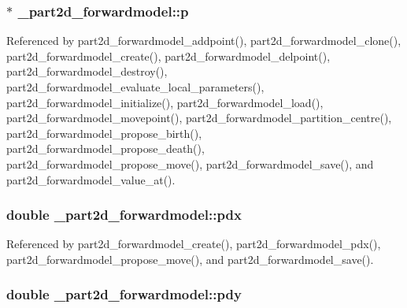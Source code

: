 \subsubsection[{\texorpdfstring{p}{p}}]{$\ast$ \+\_\+part2d\+\_\+forwardmodel\+::p}\hypertarget{struct__part2d__forwardmodel_a5e3868335795497eb056d912a0a07c12}{}\label{struct__part2d__forwardmodel_a5e3868335795497eb056d912a0a07c12}


Referenced by part2d\+\_\+forwardmodel\+\_\+addpoint(), part2d\+\_\+forwardmodel\+\_\+clone(), part2d\+\_\+forwardmodel\+\_\+create(), part2d\+\_\+forwardmodel\+\_\+delpoint(), part2d\+\_\+forwardmodel\+\_\+destroy(), part2d\+\_\+forwardmodel\+\_\+evaluate\+\_\+local\+\_\+parameters(), part2d\+\_\+forwardmodel\+\_\+initialize(), part2d\+\_\+forwardmodel\+\_\+load(), part2d\+\_\+forwardmodel\+\_\+movepoint(), part2d\+\_\+forwardmodel\+\_\+partition\+\_\+centre(), part2d\+\_\+forwardmodel\+\_\+propose\+\_\+birth(), part2d\+\_\+forwardmodel\+\_\+propose\+\_\+death(), part2d\+\_\+forwardmodel\+\_\+propose\+\_\+move(), part2d\+\_\+forwardmodel\+\_\+save(), and part2d\+\_\+forwardmodel\+\_\+value\+\_\+at().

\subsubsection[{\texorpdfstring{pdx}{pdx}}]{\setlength{\rightskip}{0pt plus 5cm}double \+\_\+part2d\+\_\+forwardmodel\+::pdx}\hypertarget{struct__part2d__forwardmodel_a2559572a48c780ed7af8c0af0ae351e2}{}\label{struct__part2d__forwardmodel_a2559572a48c780ed7af8c0af0ae351e2}


Referenced by part2d\+\_\+forwardmodel\+\_\+create(), part2d\+\_\+forwardmodel\+\_\+pdx(), part2d\+\_\+forwardmodel\+\_\+propose\+\_\+move(), and part2d\+\_\+forwardmodel\+\_\+save().

\subsubsection[{\texorpdfstring{pdy}{pdy}}]{\setlength{\rightskip}{0pt plus 5cm}double \+\_\+part2d\+\_\+forwardmodel\+::pdy}\hypertarget{struct__part2d__forwardmodel_ad58a3cf954a91a53aad984d36b997800}{}\label{struct__part2d__forwardmodel_ad58a3cf954a91a53aad984d36b997800}



